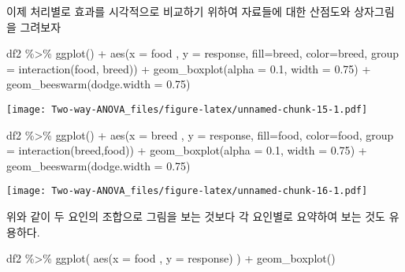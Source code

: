 \documentclass[
]{book}
\newenvironment{Shaded}{\begin{snugshade}}{\end{snugshade}}
\newcommand{\AttributeTok}[1]{\textcolor[rgb]{0.77,0.63,0.00}{#1}}
\newcommand{\FloatTok}[1]{\textcolor[rgb]{0.00,0.00,0.81}{#1}}
\newcommand{\FunctionTok}[1]{\textcolor[rgb]{0.00,0.00,0.00}{#1}}
\newcommand{\NormalTok}[1]{#1}
\newcommand{\SpecialCharTok}[1]{\textcolor[rgb]{0.00,0.00,0.00}{#1}}
\begin{document}
이제 처리별로 효과를 시각적으로 비교하기 위하여 자료들에 대한 산점도와 상자그림을 그려보자

\begin{Shaded}
\begin{Highlighting}[]
\NormalTok{df2 }\SpecialCharTok{\%\textgreater{}\%} 
  \FunctionTok{ggplot}\NormalTok{() }\SpecialCharTok{+}
  \FunctionTok{aes}\NormalTok{(}\AttributeTok{x =}\NormalTok{ food , }\AttributeTok{y =}\NormalTok{ response, }\AttributeTok{fill=}\NormalTok{breed, }\AttributeTok{color=}\NormalTok{breed, }\AttributeTok{group =} \FunctionTok{interaction}\NormalTok{(food, breed)) }\SpecialCharTok{+}
  \FunctionTok{geom\_boxplot}\NormalTok{(}\AttributeTok{alpha =} \FloatTok{0.1}\NormalTok{, }\AttributeTok{width =} \FloatTok{0.75}\NormalTok{) }\SpecialCharTok{+}
  \FunctionTok{geom\_beeswarm}\NormalTok{(}\AttributeTok{dodge.width =} \FloatTok{0.75}\NormalTok{)}
\end{Highlighting}
\end{Shaded}

\texttt{[image: Two-way-ANOVA\_files/figure-latex/unnamed-chunk-15-1.pdf]}

\begin{Shaded}
\begin{Highlighting}[]
\NormalTok{df2 }\SpecialCharTok{\%\textgreater{}\%} 
  \FunctionTok{ggplot}\NormalTok{() }\SpecialCharTok{+}
  \FunctionTok{aes}\NormalTok{(}\AttributeTok{x =}\NormalTok{ breed  , }\AttributeTok{y =}\NormalTok{ response, }\AttributeTok{fill=}\NormalTok{food, }\AttributeTok{color=}\NormalTok{food, }\AttributeTok{group =} \FunctionTok{interaction}\NormalTok{(breed,food)) }\SpecialCharTok{+}
  \FunctionTok{geom\_boxplot}\NormalTok{(}\AttributeTok{alpha =} \FloatTok{0.1}\NormalTok{, }\AttributeTok{width =} \FloatTok{0.75}\NormalTok{) }\SpecialCharTok{+}
  \FunctionTok{geom\_beeswarm}\NormalTok{(}\AttributeTok{dodge.width =} \FloatTok{0.75}\NormalTok{)}
\end{Highlighting}
\end{Shaded}

\texttt{[image: Two-way-ANOVA\_files/figure-latex/unnamed-chunk-16-1.pdf]}

위와 같이 두 요인의 조합으로 그림을 보는 것보다 각 요인별로 요약하여 보는 것도 유용하다.

\begin{Shaded}
\begin{Highlighting}[]
\NormalTok{df2 }\SpecialCharTok{\%\textgreater{}\%} 
  \FunctionTok{ggplot}\NormalTok{( }\FunctionTok{aes}\NormalTok{(}\AttributeTok{x =}\NormalTok{ food , }\AttributeTok{y =}\NormalTok{ response) ) }\SpecialCharTok{+}
  \FunctionTok{geom\_boxplot}\NormalTok{()}
\end{Highlighting}
\end{Shaded}
\end{document}
